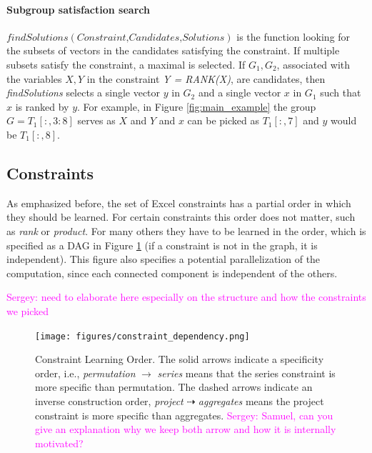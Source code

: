 \documentclass{ecai}
\newcommand{\sergey}[1]{\textcolor{magenta}{{\sc Sergey:} #1}\xspace}
\newcommand{\format}[1]{\textit{#1}\xspace}
\newcommand{\findassignment}{\format{findSolutions}}
\begin{document}
\paragraph{Subgroup satisfaction search} $\findassignment(\textit{Constraint,Candidates,Solutions})$ is the function looking for the subsets of vectors in the candidates satisfying the constraint. If multiple subsets satisfy the constraint, a maximal is selected. If $G_1,G_2$, associated with the variables $X,Y$ in the constraint \textit{Y = RANK(X)}, are candidates, then \findassignment selects a single vector $y$ in $G_2$ and a single vector $x$ in $G_1$ such that $x$ is ranked by $y$. For example, in Figure \ref{fig:main_example} the group $G = T_1[{:},3{:}8]$ serves as $X$ and $Y$ and $x$ can be picked as $T_1[{:},7]$ and $y$ would be $T_1[{:},8]$.

\subsection{Constraints}
As emphasized before, the set of Excel constraints has a partial order in which they should be learned. For certain constraints this order does not matter, such as \textit{rank} or \textit{product}. For many others they have to be learned in the order, which is specified as a DAG in Figure \ref{fig:learning_order} (if a constraint is not in the graph, it is independent). This figure also specifies a potential parallelization of the computation, since each connected component is independent of the others.

\sergey{need to elaborate here especially on the structure and how the constraints we picked}

\begin{figure}[htb]
  \centering
  \texttt{[image: figures/constraint\_dependency.png]}
  \caption{Constraint Learning Order. The solid arrows indicate a specificity order, i.e., \textit{permutation} $\rightarrow$ \textit{series} means that the series constraint is more specific than permutation. The dashed arrows indicate an inverse construction order, \textit{project} $\dashrightarrow$ \textit{aggregates} means the project constraint is more specific than aggregates. \sergey{Samuel,  can you give an explanation why we keep both arrow and how it is internally motivated?}}
  \label{fig:learning_order}
\end{figure}


\newcommand{\numeric}{\format{numeric}}
\newcommand{\textual}{\format{textual}}
\newcommand{\integer}{\format{integer}}
\newcommand{\length}{\format{length}}
\newcommand{\nat}{\mathcal{N}}
\end{document}
